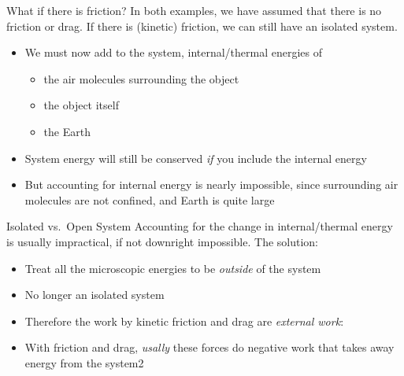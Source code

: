 \documentclass[12pt,compress,aspectratio=169]{beamer}
\begin{document}
\begin{frame}{What if there is friction?}
  In both examples, we have assumed that {\color{orange}there is no friction or
    drag}. If there is (kinetic) friction, we can still have an isolated
  system.
%  
  \begin{itemize}
  \item We must now add to the system, internal/thermal energies of
    \begin{itemize}
    \item the air molecules surrounding the object
    \item the object itself
    \item the Earth
    \end{itemize}
  \item System energy will still be conserved \emph{if} you include the internal
    energy
  \item But accounting for internal energy is nearly impossible, since
    surrounding air molecules are not confined, and Earth is quite large
  \end{itemize}
\end{frame}



\begin{frame}{Isolated vs.\ Open System}
  Accounting for the change in internal/thermal energy is usually impractical,
  if not downright impossible. The solution:
  \begin{itemize}
  \item Treat all the microscopic energies to be \emph{outside} of the system
  \item No longer an isolated system
  \item Therefore the work by kinetic friction and drag are
    \emph{external work}:


  \item With friction and drag, \emph{usally} these forces do negative work
    that takes away energy from the system2
  \end{itemize}
\end{frame}
\end{document}
